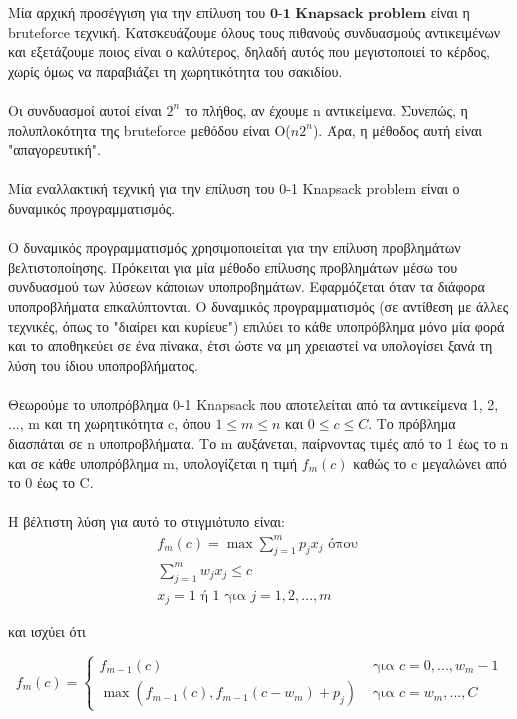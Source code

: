 \documentclass[12pt]{article}
\begin{document}
Μία αρχική προσέγγιση για την επίλυση του \(\textbf{0-1 Knapsack problem}\) είναι η bruteforce τεχνική. Κατσκευάζουμε όλους τους πιθανούς συνδυασμούς αντικειμένων και εξετάζουμε ποιος είναι ο καλύτερος, δηλαδή αυτός που μεγιστοποιεί το κέρδος, χωρίς όμως να παραβιάζει τη χωρητικότητα του σακιδίου. \\ \\

Οι συνδυασμοί αυτοί είναι \(2^{n}\) το πλήθος, αν έχουμε n αντικείμενα. Συνεπώς, η πολυπλοκότητα της bruteforce μεθόδου είναι O(\(n2^{n}\)). Άρα, η μέθοδος αυτή είναι "απαγορευτική". \\ \\

Μία εναλλακτική τεχνική για την επίλυση του 0-1 Knapsack problem είναι ο δυναμικός προγραμματισμός. \\ \\

Ο δυναμικός προγραμματισμός χρησιμοποιείται για την
επίλυση προβλημάτων βελτιστοποίησης. Πρόκειται για μία μέθοδο επίλυσης προβλημάτων μέσω του συνδυασμού των λύσεων κάποιων υποπροβημάτων. Εφαρμόζεται όταν τα διάφορα υποπροβλήματα επκαλύπτονται. Ο δυναμικός προγραμματισμός (σε αντίθεση με άλλες τεχνικές, όπως το "διαίρει και κυρίευε") επιλύει το κάθε υποπρόβλημα μόνο μία φορά και το αποθηκεύει σε ένα πίνακα, έτσι ώστε να μη χρειαστεί να υπολογίσει ξανά τη λύση του ίδιου υποπροβλήματος. \\ \\

Θεωρούμε το υποπρόβλημα 0-1 Knapsack που αποτελείται από τα αντικείμενα 1, 2, ..., m και τη χωρητικότητα c, όπου \(1 \leq m \leq n\) και \(0 \leq c \leq C\). Το πρόβλημα διασπάται σε n υποπροβλήματα. Το m αυξάνεται, παίρνοντας τιμές από το 1
έως το n και σε κάθε υποπρόβλημα m, υπολογίζεται η τιμή \(f_{m}(c)\) καθώς το
c μεγαλώνει από το 0 έως το C. \\ \\

Η βέλτιστη λύση για αυτό το στιγμιότυπο είναι:
\begin{align*}
	f_{m}(c) = \max {\sum_{j=1}^{m}{p_{j}x_{j}}} \text{ όπου } \\
	\sum_{j=1}^{m}{w_{j}x_{j}} \leq c \\
	x_{j} = 1 \text{ ή } 1 \text{ για } j=1,2,...,m
\end{align*}

και ισχύει ότι

 \[ f_{m}(c) =
\begin{cases}
f_{m-1}(c) & \text{ για } c = 0,...,w_{m}-1 \\
\max \left( f_{m-1}(c), f_{m-1}(c-w_{m}) + p_{j} \right) & \text{ για } c = w_{m},...,C
\end{cases}
\]
\end{document}
